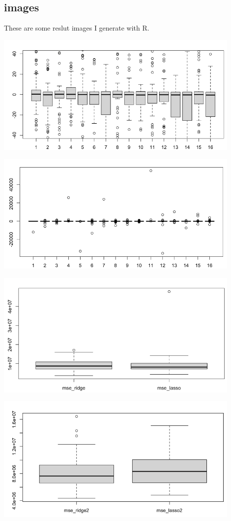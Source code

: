 \subsection{images}
These are some reslut images I generate with R.\par
\includegraphics[width = 0.9\textwidth]{figure1.jpg}\par
\includegraphics[width = 0.9\textwidth]{figure2.jpg}\par
\includegraphics[width = 0.9\textwidth]{figure3.jpg}\par
\includegraphics[width = 0.9\textwidth]{figure4.jpg}\par

